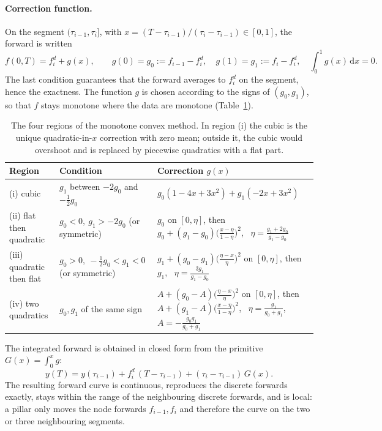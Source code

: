 \documentclass[11pt,a4paper]{article}
\theoremstyle{plain}
\theoremstyle{definition}
\newcommand{\dd}{\mathrm{d}}
\begin{document}
\paragraph{Correction function.} On the segment $(\tau_{i-1},\tau_i]$, with $x=(T-\tau_{i-1})/(\tau_i-\tau_{i-1})\in[0,1]$, the forward is written
\begin{equation}
    f(0,T)=f^d_i+g(x),\qquad g(0)=g_0:=f_{i-1}-f^d_i,\quad g(1)=g_1:=f_i-f^d_i,\quad \int_0^1g(x)\,\dd x=0.
    \label{eq:mc-g}
\end{equation}
The last condition guarantees that the forward averages to $f^d_i$ on the segment, hence the exactness. The function $g$ is chosen according to the signs of $(g_0,g_1)$, so that $f$ stays monotone where the data are monotone (Table~\ref{tab:mc-regions}).

\begin{table}[htbp]
\centering
\small
\renewcommand{\arraystretch}{1.35}
\begin{tabular}{@{}p{3.2cm}p{4.2cm}p{7.3cm}@{}}
\toprule
Region & Condition & Correction $g(x)$ \\
\midrule
(i) cubic & $g_1$ between $-2g_0$ and $-\tfrac12g_0$ & $g_0(1-4x+3x^2)+g_1(-2x+3x^2)$ \\
(ii) flat then quadratic & $g_0<0,\ g_1>-2g_0$ (or symmetric) & $g_0$ on $[0,\eta]$, then $g_0+(g_1-g_0)\bigl(\frac{x-\eta}{1-\eta}\bigr)^2$, \ $\eta=\frac{g_1+2g_0}{g_1-g_0}$ \\
(iii) quadratic then flat & $g_0>0,\ -\tfrac12g_0<g_1<0$ (or symmetric) & $g_1+(g_0-g_1)\bigl(\frac{\eta-x}{\eta}\bigr)^2$ on $[0,\eta]$, then $g_1$, \ $\eta=\frac{3g_1}{g_1-g_0}$ \\
(iv) two quadratics & $g_0,g_1$ of the same sign & $A+(g_0-A)\bigl(\frac{\eta-x}{\eta}\bigr)^2$ on $[0,\eta]$, then $A+(g_1-A)\bigl(\frac{x-\eta}{1-\eta}\bigr)^2$, \ $\eta=\frac{g_1}{g_0+g_1}$, $A=-\frac{g_0g_1}{g_0+g_1}$ \\
\bottomrule
\end{tabular}
\caption{The four regions of the monotone convex method. In region (i) the cubic is the unique quadratic-in-$x$ correction with zero mean; outside it, the cubic would overshoot and is replaced by piecewise quadratics with a flat part.}
\label{tab:mc-regions}
\end{table}

The integrated forward is obtained in closed form from the primitive $G(x)=\int_0^xg$:
\begin{equation}
    y(T)=y(\tau_{i-1})+f^d_i\,(T-\tau_{i-1})+(\tau_i-\tau_{i-1})\,G(x).
\end{equation}
The resulting forward curve is continuous, reproduces the discrete forwards exactly, stays within the range of the neighbouring discrete forwards, and is local: a pillar only moves the node forwards $f_{i-1},f_i$ and therefore the curve on the two or three neighbouring segments.
\end{document}
